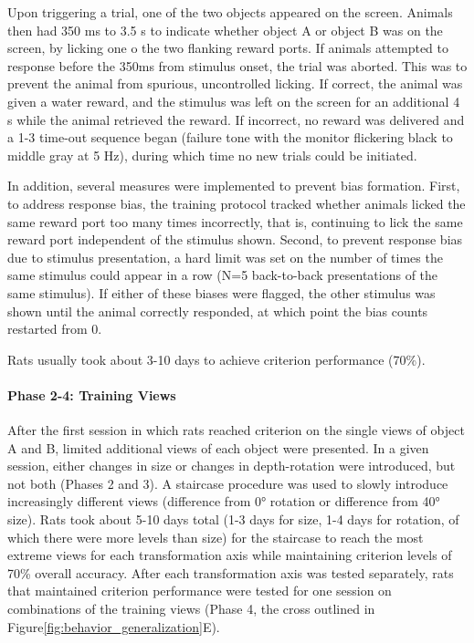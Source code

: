 Upon triggering a trial, one of the two objects appeared on the screen. Animals then had 350 ms to 3.5 s to indicate whether object A or object B was on the screen, by licking one o the two flanking reward ports. If animals attempted to response before the 350ms from stimulus onset, the trial was aborted. This was to prevent the animal from spurious, uncontrolled licking. If correct, the animal was given a water reward, and the stimulus was left on the screen for an additional 4 s while the animal retrieved the reward. If incorrect, no reward was delivered and a 1-3 time-out sequence began (failure tone with the monitor flickering black to middle gray at 5 Hz), during which time no new trials could be initiated. 

In addition, several measures were implemented to prevent bias formation. First, to address response bias, the training protocol tracked whether animals licked the same reward port too many times incorrectly, that is, continuing to lick the same reward port independent of the stimulus shown. Second, to prevent response bias due to stimulus presentation, a hard limit was set on the number of times the same stimulus could appear in a row (N=5 back-to-back presentations of the same stimulus). If either of these biases were flagged, the other stimulus was shown until the animal correctly responded, at which point the bias counts restarted from 0.

Rats usually took about 3-10 days to achieve criterion performance (70\%).  

\paragraph{Phase 2-4: Training Views}
After the first session in which rats reached criterion on the single views of object A and B, limited additional views of each object were presented. In a given session, either changes in size or changes in depth-rotation were introduced, but not both (Phases 2 and 3). A staircase procedure was used to slowly introduce increasingly different views (difference from \ang{0} rotation or difference from \ang{40} size). Rats took about 5-10 days total (1-3 days for size, 1-4 days for rotation, of which there were more levels than size) for the staircase to reach the most extreme views for each transformation axis while maintaining criterion levels of 70\% overall accuracy. After each transformation axis was tested separately, rats that maintained criterion performance were tested for one session on combinations of the training views (Phase 4, the cross outlined in Figure\ref{fig:behavior_generalization}E). 

